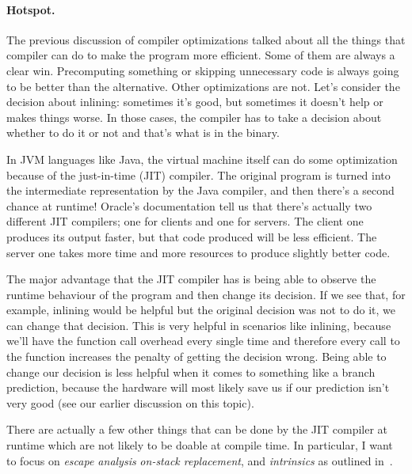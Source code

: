 \documentclass[a4paper]{report}
\begin{document}
\paragraph{Hotspot.}
The previous discussion of compiler optimizations talked about all the things that compiler can do to make the program more efficient. Some of them are always a clear win. Precomputing something or skipping unnecessary code is always going to be better than the alternative. Other optimizations are not. Let's consider the decision about inlining: sometimes it's good, but sometimes it doesn't help or makes things worse. In those cases, the compiler has to take a decision about whether to do it or not and that's what is in the binary.

In JVM languages like Java, the virtual machine itself can do some optimization because of the just-in-time (JIT) compiler. The original program is turned into the intermediate representation by the Java compiler, and then there's a second chance at runtime! Oracle's documentation tell us that there's actually two different JIT compilers; one for clients and one for servers. The client one produces its output faster, but that code produced will be less efficient. The server one takes more time and more resources to produce slightly better code.

The major advantage that the JIT compiler has is being able to observe the runtime behaviour of the program and then change its decision. If we see that, for example, inlining would be helpful but the original decision was not to do it, we can change that decision. This is very helpful in scenarios like inlining, because we'll have the function call overhead every single time and therefore every call to the function increases the penalty of getting the decision wrong. Being able to change our decision is less helpful when it comes to something like a branch prediction, because the hardware will most likely save us if our prediction isn't very good (see our earlier discussion on this topic).

There are actually a few other things that can be done by the JIT compiler at runtime which are not likely to be doable at compile time. In particular, I want to focus on \textit{escape analysis} \textit{on-stack replacement}, and \textit{intrinsics} as outlined in~\cite{escape}.
\end{document}
